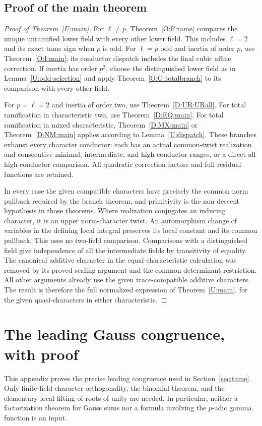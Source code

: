 \documentclass[11pt]{amsart}
\theoremstyle{definition}
\theoremstyle{remark}
\begin{document}
\subsection{Proof of the main theorem}
\begin{proof}[Proof of Theorem~\ref{U:main}]
For $\ell\ne p$, Theorem~\ref{O:F:tame} compares the unique unramified
lower field with every other lower field. This includes $\ell=2$ and
its exact tame sign when $p$ is odd.
For $\ell=p$ odd and inertia of order $p$, use
Theorem~\ref{O:I:main}; its conductor dispatch includes the final cubic
affine correction. If inertia has order $p^2$, choose the distinguished
lower field as in Lemma~\ref{U:odd-selection} and apply
Theorem~\ref{O:G:totalbranch} to its comparison with every other field.

For $p=\ell=2$ and inertia of order two, use Theorem~\ref{D:UR:URall}.
For total ramification in characteristic two, use
Theorem~\ref{D:EQ:main}. For total ramification in mixed characteristic,
Theorem~\ref{D:MX:main} or Theorem~\ref{D:NM:main} applies according to
Lemma~\ref{U:dispatch}. These branches exhaust every character conductor:
each has an actual common-twist realization and consecutive minimal,
intermediate, and high conductor ranges, or a direct all-high-conductor
comparison. All quadratic correction factors and full residual functions
are retained.

In every case the given compatible characters have precisely the common
norm pullback required by the branch theorem, and primitivity is the
non-descent hypothesis in those theorems. Where realization conjugates
an inducing character, it is an upper norm-character twist. An
automorphism change of variables in the defining local integral preserves
its local constant and its common pullback. This uses no two-field
comparison. Comparisons with a distinguished field give independence of
all the intermediate fields by transitivity of equality.
The canonical additive character in the equal-characteristic calculation
was removed by its proved scaling argument and the common determinant
restriction. All other arguments already use the given trace-compatible
additive characters. The result is therefore the full normalized expression
of Theorem~\ref{U:main}, for the given quasi-characters in either
characteristic.
\end{proof}


\appendix
{}
\section{The leading Gauss congruence, with proof}\label{app:leading-gauss}
This appendix proves the precise leading congruence used in
Section~\ref{sec:tame}. Only finite-field character orthogonality, the
binomial theorem, and the elementary local lifting of roots of unity are
needed. In particular, neither a factorization theorem for Gauss sums nor
a formula involving the $p$-adic gamma function is an input.
\end{document}

